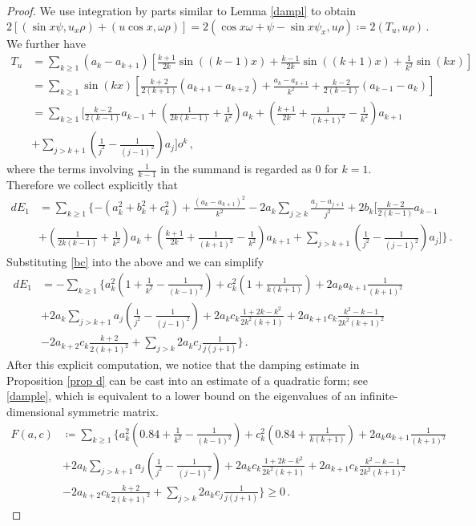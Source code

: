 \documentclass[10pt,a4paper]{amsart}
\begin{document}
\begin{proof}
We use integration by parts similar to Lemma \ref{dampl} to obtain 
$$2[(\sin x\psi,u_x\rho)+ (u \cos{x},\omega \rho)]=2(\cos{x}\omega+\psi-\sin x\psi_x,u\rho)\coloneqq2(T_u,u\rho)\,.$$
We further have $$\begin{aligned}
T_u&=\sum_{k \geq 1} (a_k-a_{k+1})[\frac{k+1}{2k}\sin((k-1)x)+\frac{k-1}{2k}\sin((k+1)x)+\frac{1}{k^2}\sin(kx)]\\&=\sum_{k \geq 1} \sin(kx) [\frac{k+2}{2(k+1)}(a_{k+1}-a_{k+2})+\frac{a_{k}-a_{k+1}}{k^2}+\frac{k-2}{2(k-1)}(a_{k-1}-a_{k})]\\&=\sum_{k\geq 1}[\frac{k-2}{2(k-1)}a_{k-1}+(\frac{1}{2k(k-1)}+\frac{1}{k^2})a_{k}+(\frac{k+1}{2k}+\frac{1}{(k+1)^2}-\frac{1}{k^2})a_{k+1}\\&+\sum_{j>k+1}(\frac{1}{j^2}-\frac{1}{(j-1)^2})a_j]o^k\,,  
\end{aligned}$$
where the terms involving $\frac{1}{k-1}$ in the summand is regarded as $0$ for $k=1$. Therefore we collect explicitly that 
$$\begin{aligned}
dE_1&=\sum_{k\geq 1}\{ -(a_k^2+b_k^2+c_k^2)+ \frac{(a_k-a_{k+1})^2}{k^2}-2 a_k\sum_{j\geq k}\frac{a_j-a_{j+1}}{j^2}+2b_k[\frac{k-2}{2(k-1)}a_{k-1}\\&+(\frac{1}{2k(k-1)}+\frac{1}{k^2})a_{k}+(\frac{k+1}{2k}+\frac{1}{(k+1)^2}-\frac{1}{k^2})a_{k+1}+\sum_{j>k+1}(\frac{1}{j^2}-\frac{1}{(j-1)^2})a_j]\}\,.\end{aligned}$$
Substituting \eqref{bc} into the above and we can simplify
$$
\begin{aligned}
dE_1&=-\sum_{k \geq 1}\{ a_k^2(1+\frac{1}{k^2}-\frac{1}{(k-1)^2})+c_k^2(1+\frac{1}{k(k+1)})+ 2a_k a_{k+1}\frac{1}{(k+1)^2}\\&+2 a_k \sum_{j>k+1}a_j(\frac{1}{j^2}-\frac{1}{(j-1)^2})+2a_kc_k\frac{1+2k-k^2}{2k^2(k+1)}+2a_{k+1}c_k\frac{k^2-k-1}{2k^2(k+1)^2}\\&-2a_{k+2}c_k\frac{k+2}{2(k+1)^2}+\sum_{j>k}2a_k c_j\frac{1}{j(j+1)}\}\,.\end{aligned}$$
After this explicit computation, we notice that the damping estimate in Proposition \ref{prop d} can be cast into an estimate of a quadratic form; see \eqref{dample}, which is equivalent to a lower bound on the eigenvalues of an infinite-dimensional symmetric matrix. 
\begin{equation}
    \label{dample}\begin{aligned}
 F(a,c)&\coloneqq \sum_{k\geq1}\{ a_k^2(0.84+\frac{1}{k^2}-\frac{1}{(k-1)^2})+c_k^2(0.84+\frac{1}{k(k+1)})+ 2a_k a_{k+1}\frac{1}{(k+1)^2}\\&+2 a_k \sum_{j>k+1}a_j(\frac{1}{j^2}-\frac{1}{(j-1)^2})+2a_kc_k\frac{1+2k-k^2}{2k^2(k+1)}+2a_{k+1}c_k\frac{k^2-k-1}{2k^2(k+1)^2}\\&-2a_{k+2}c_k\frac{k+2}{2(k+1)^2}+\sum_{j>k}2a_k c_j\frac{1}{j(j+1)}\}\geq0\,.\end{aligned}\end{equation}


\end{proof}
\end{document}
